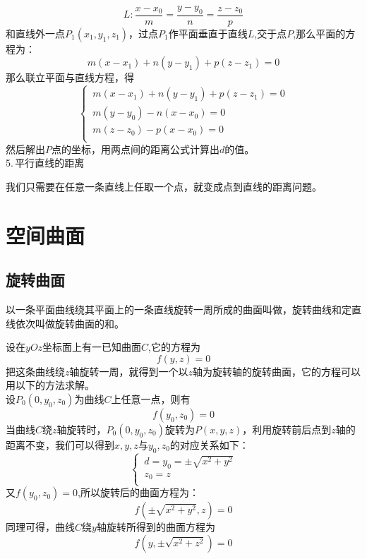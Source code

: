 \begin{equation}
	L:\frac{x-x_0}{m}=\frac{y-y_0}{n}=\frac{z-z_0}{p}
\end{equation}
和直线外一点$P_1(x_1,y_1,z_1)$，过点$P_1$作平面垂直于直线$L$,交于点$P$,那么平面的方程为：
\begin{equation}
	m(x-x_1)+n(y-y_1)+p(z-z_1)=0
\end{equation}
那么联立平面与直线方程，得
\begin{equation}
	\begin{cases}
		\, m(x-x_1)+n(y-y_1)+p(z-z_1)=0\\
		\, m(y-y_0)-n(x-x_0)=0\\
		\, m(z-z_0)-p(x-x_0)=0\\
	\end{cases}
\end{equation}
然后解出$P$点的坐标，用两点间的距离公式计算出$d$的值。
\\ 5.$\,$平行直线的距离
\par 我们只需要在任意一条直线上任取一个点，就变成点到直线的距离问题。
\section{空间曲面}
\subsection{旋转曲面}

以一条平面曲线绕其平面上的一条直线旋转一周所成的曲面叫做，旋转曲线和定直线依次叫做旋转曲面的和。
\par 设在$yOz$坐标面上有一已知曲面$C$,它的方程为
\begin{equation}
	f(y,z)=0
\end{equation}
把这条曲线绕$z$轴旋转一周，就得到一个以$z$轴为旋转轴的旋转曲面，它的方程可以用以下的方法求解。\\
设$P_0(0,y_0,z_0)$为曲线$C$上任意一点，则有
\begin{equation}
	f(y_0,z_0)=0
\end{equation}
当曲线$C$绕$z$轴旋转时，$P_0(0,y_0,z_0)$旋转为$P(x,y,z)$，利用旋转前后点到$z$轴的距离不变，我们可以得到$x,y,z$与$y_0,z_0$的对应关系如下：
\begin{equation}
	\begin{cases}
	\,  d=y_0=\pm\sqrt{x^2+y^2}\\
	\, z_0=z\\
	\end{cases}
\end{equation}
又$f(y_0,z_0)=0$,所以旋转后的曲面方程为：
\begin{equation}
	f(\pm\sqrt{x^2+y^2},z)=0
\end{equation}
同理可得，曲线$C$绕$y$轴旋转所得到的曲面方程为
\begin{equation}
	f(y,\pm \sqrt{x^2+z^2})=0
\end{equation}
